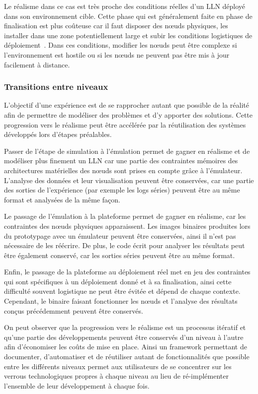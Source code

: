 Le réalisme dans ce cas est très proche des conditions réelles d'un \ac{LLN} déployé dans son environnement cible.
Cette phase qui est généralement faite en phase de finalisation est plus coûteuse car il faut disposer des nœuds physiques, les installer dans une zone potentiellement large et subir les conditions logistiques de déploiement~\cite{werner2006deploying}.
Dans ces conditions, modifier les nœuds peut être complexe si l'environnement est hostile ou si les nœuds ne peuvent pas être mis à jour facilement à distance.

\subsubsection{Transitions entre niveaux}
\label{makesense:transition}

L'objectif d'une expérience est de se rapprocher autant que possible de la réalité afin de permettre de modéliser des problèmes et d'y apporter des solutions.
Cette progression vers le réalisme peut être accélérée par la réutilisation des systèmes développés lors d'étapes préalables.

Passer de l'étape de simulation à l'émulation permet de gagner en réalisme et de modéliser plus finement un \ac{LLN} car une partie des contraintes mémoires des architectures matérielles des nœuds sont prises en compte grâce à l'émulateur.
L'analyse des données et leur visualisation peuvent être conservées, car une partie des sorties de l'expérience (par exemple les logs séries) peuvent être au même format et analysées de la même façon.

Le passage de l'émulation à la plateforme permet de gagner en réalisme, car les contraintes des nœuds physiques apparaissent.
Les images binaires produites lors du prototypage avec un émulateur peuvent être conservées, ainsi il n'est pas nécessaire de les réécrire.
De plus, le code écrit pour analyser les résultats peut être également conservé, car les sorties séries peuvent être au même format.

Enfin, le passage de la plateforme au déploiement réel met en jeu des contraintes qui sont spécifiques à un déploiement donné et à sa finalisation, ainsi cette difficulté souvent logistique ne peut être évitée et dépend de chaque contexte.
Cependant, le binaire faisant fonctionner les nœuds et l'analyse des résultats conçus précédemment peuvent être conservés.

On peut observer que la progression vers le réalisme est un processus itératif et qu'une partie des développements peuvent être conservés d'un niveau à l'autre afin d'économiser les coûts de mise en place.
Ainsi un framework permettant de documenter, d'automatiser et de réutiliser autant de fonctionnalités que possible entre les différents niveaux permet aux utilisateurs de se concentrer sur les verrous technologiques propres à chaque niveau au lieu de ré-implémenter l'ensemble de leur développement à chaque fois. 

